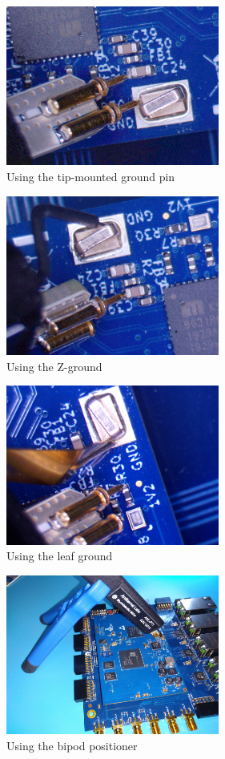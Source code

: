 \documentclass[11pt]{article}
\begin{document}
\begin{figure}[h!]
\centering
\includegraphics[width=7cm]{tip-ground-01.jpg}
\caption{Using the tip-mounted ground pin}
\end{figure}

\begin{figure}[h!]
\centering
\includegraphics[width=7cm]{zground-usage.jpg}
\caption{Using the Z-ground}
\end{figure}

\begin{figure}[h!]
\centering
\includegraphics[width=7cm]{leafground-usage.jpg}
\caption{Using the leaf ground}
\end{figure}

\begin{figure}[h!]
\centering
\includegraphics[width=7cm]{bipod-usage.jpg}
\caption{Using the bipod positioner}
\end{figure}
\end{document}
